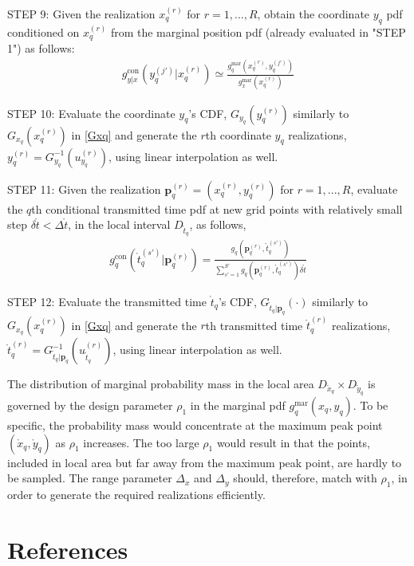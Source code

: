 \documentclass[review]{elsarticle}
\begin{document}
STEP 9: Given the realization $x_q^{(r)}$ for $r=1,...,R$, obtain the coordinate $y_q$ pdf conditioned on $x_q^{(r)}$ from the marginal position pdf (already evaluated in "STEP 1") as follows:
\begin{align}
    g_{y\vert x}^{\text{con}}(y_q^{(j')}\vert x_q^{(r)})\simeq \frac{g_{q}^{\text{mar}}(x_q^{(r)},y_q^{(j')})}{g_{x}^{\text{mar}}(x_q^{(r)})}
\end{align}

STEP 10: Evaluate the coordinate $y_q$'s CDF, $G_{y_q}(y_q^{(r)})$ similarly to $G_{x_q}(x_q^{(r)})$ in \eqref{Gxq} and generate the $r$th coordinate $y_q$ realizations, $y_q^{(r)}=G_{y_q}^{-1}(u_{y_q}^{(r)})$, using linear interpolation as well.

STEP 11: Given the realization $\boldsymbol{p}_q^{(r)}=(x_q^{(r)},y_q^{(r)})$ for $r=1,...,R$, evaluate the $q$th conditional transmitted time pdf at new grid points with relatively small step $\delta \mathring{t}<\Delta \mathring{t}$, in the local interval $D_{\mathring{t}_q}$, as follows,
\begin{align}
    g_{q}^{\text{con}}(\mathring{t}_q^{(s')} \vert \boldsymbol{p}_q^{(r)})=\frac{g_q(\boldsymbol{p}_q^{(r)},\mathring{t}_q^{(s')})}{\sum_{s'=1}^{S'} g_q(\boldsymbol{p}_q^{(r)},\mathring{t}_q^{(s')})\delta\mathring{t}}
\end{align}

STEP 12: Evaluate the transmitted time $\mathring{t}_q$'s CDF, $G_{\mathring{t}_q\vert \boldsymbol{p}_q}(\cdot)$ similarly to $G_{x_q}(x_q^{(r)})$ in \eqref{Gxq} and generate the $r$th transmitted time $\mathring{t}_q^{(r)}$ realizations, $\mathring{t}_q^{(r)}=G^{-1}_{\mathring{t}_q\vert \boldsymbol{p}_q}(u_{\mathring{t}_q}^{(r)})$, using linear interpolation as well.

The distribution of marginal probability mass in the local area $D_{\mathring{x}_q}\times D_{\mathring{y}_q}$ is governed by the design parameter $\rho_1$ in the marginal pdf $g_{q}^{\text{mar}}(x_q,y_q)$. To be specific, the probability mass would concentrate at the maximum peak point $(\mathring{x}_q,\mathring{y}_q)$ as $\rho_1$ increases. The too large $\rho_1$ would result in that the points, included in local area but far away from the maximum peak point, are hardly to be sampled. The range parameter $\Delta_x$ and $\Delta_y$ should, therefore, match with $\rho_1$, in order to generate the required realizations efficiently.

\section*{References}

\end{document}
